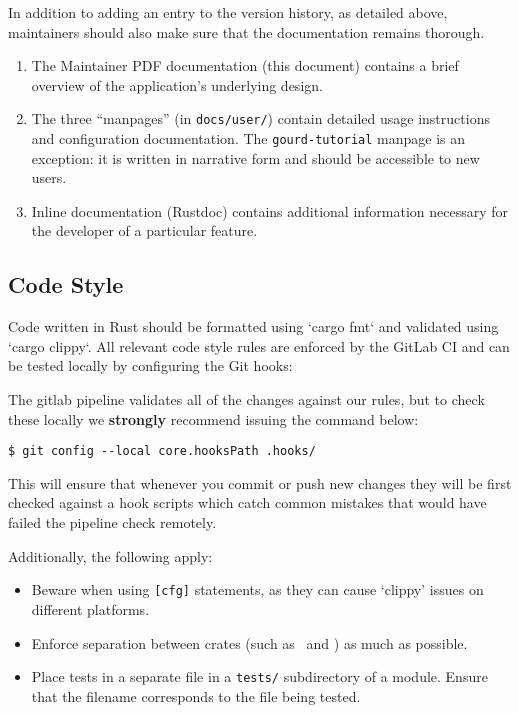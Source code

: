 In addition to adding an entry to the version history, as detailed above, maintainers should also make sure that the
documentation remains thorough.
\begin{enumerate}
  \item The Maintainer PDF documentation (this document) contains a brief overview of the application's underlying design.
  \item The three ``manpages'' (in \verb|docs/user/|) contain detailed usage instructions and configuration documentation.
    The \texttt{gourd-tutorial} manpage is an exception: it is written in narrative form and should be accessible to new users.
  \item Inline documentation (Rustdoc) contains additional information necessary for the developer of a particular feature.
\end{enumerate}

\subsection{Code Style}

Code written in Rust should be formatted using `cargo fmt` and validated using `cargo clippy`.
All relevant code style rules are enforced by the GitLab CI and can be tested locally
by configuring the Git hooks:

The gitlab pipeline validates all of the changes against our rules, but to check these locally
we \textbf{strongly} recommend issuing the command below:

\begin{verbatim}
$ git config --local core.hooksPath .hooks/
\end{verbatim}

This will ensure that whenever you commit or push new changes they will be first checked against
a hook scripts which catch common mistakes that would have failed the pipeline check remotely.

Additionally, the following apply:
\begin{itemize}
  \item Beware when using \verb|[cfg]| statements, as they can cause `clippy' issues on different platforms.
  \item Enforce separation between crates (such as \gourd\ and \gourdwrap) as much as possible.
  \item Place tests in a separate file in a \verb|tests/| subdirectory of a module.
        Ensure that the filename corresponds to the file being tested.
\end{itemize}

